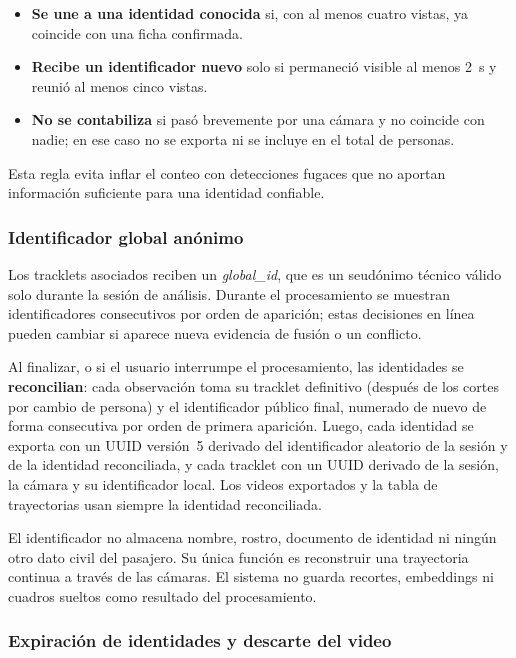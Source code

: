 \documentclass[12pt,letterpaper]{article}
\begin{document}
\begin{itemize}
    \item \textbf{Se une a una identidad conocida} si, con al menos
    cuatro vistas, ya coincide con una ficha confirmada.
    \item \textbf{Recibe un identificador nuevo} solo si permaneció
    visible al menos 2~s y reunió al menos cinco vistas.
    \item \textbf{No se contabiliza} si pasó brevemente por una cámara y
    no coincide con nadie; en ese caso no se exporta ni se incluye en el
    total de personas.
\end{itemize}

Esta regla evita inflar el conteo con detecciones fugaces que no aportan
información suficiente para una identidad confiable.

\subsubsection{Identificador global anónimo}

Los tracklets asociados reciben un \textit{global\_id}, que es un
seudónimo técnico válido solo durante la sesión de análisis. Durante el
procesamiento se muestran identificadores consecutivos por orden de
aparición; estas decisiones en línea pueden cambiar si aparece nueva
evidencia de fusión o un conflicto.

Al finalizar, o si el usuario interrumpe el procesamiento, las
identidades se \textbf{reconcilian}: cada observación toma su tracklet
definitivo (después de los cortes por cambio de persona) y el
identificador público final, numerado de nuevo de forma consecutiva por
orden de primera aparición. Luego, cada identidad se exporta con un UUID
versión~5 derivado del identificador aleatorio de la sesión y de la
identidad reconciliada, y cada tracklet con un UUID derivado de la
sesión, la cámara y su identificador local. Los videos exportados y la
tabla de trayectorias usan siempre la identidad reconciliada.

El identificador no almacena nombre, rostro, documento de identidad ni
ningún otro dato civil del pasajero. Su única función es reconstruir una
trayectoria continua a través de las cámaras. El sistema no guarda
recortes, embeddings ni cuadros sueltos como resultado del
procesamiento.

\subsubsection{Expiración de identidades y descarte del video}
\end{document}

